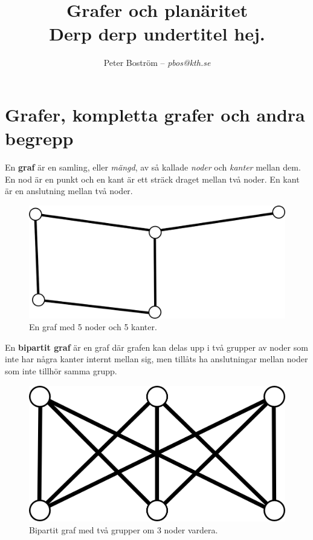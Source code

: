 \documentclass[a4paper,11pt]{article}
\title{Grafer och planäritet\\\vspace{4pt}\normalsize Derp derp undertitel hej.}
\author{Peter Boström -- \emph{pbos@kth.se}}
\begin{document}
\maketitle
\pagestyle{fancyplain}

\section*{Grafer, kompletta grafer och andra begrepp}

En \textbf{graf} är en samling, eller \emph{mängd}, av så kallade \emph{noder} och \emph{kanter} mellan dem. En nod är en punkt och en kant är ett sträck draget mellan två noder. En kant är en anslutning mellan två noder.

\begin{figure}[!ht]
	\begin{center}
		\includegraphics{fig1}
		\caption{En graf med 5 noder och 5 kanter.}
		\label{fig1}
	\end{center}
\end{figure}
\FloatBarrier

En \textbf{bipartit graf} är en graf där grafen kan delas upp i två grupper av noder som inte har några kanter internt mellan sig, men tillåts ha anslutningar mellan noder som inte tillhör samma grupp.

\begin{figure}[!ht]
	\begin{center}
		\includegraphics{fig2}
		\caption{Bipartit graf med två grupper om 3 noder vardera.}
		\label{fig2}
	\end{center}
\end{figure}
\FloatBarrier
\end{document}
